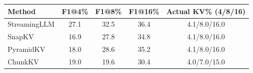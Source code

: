 \begin{tabular}{@{}lcccc@{}}
\toprule
Method & F1@4\% & F1@8\% & F1@16\% & Actual KV\% (4/8/16) \\
\midrule
StreamingLLM & 27.1 & 32.5 & 36.4 & 4.1/8.0/16.0 \\
SnapKV & 16.9 & 27.8 & 34.8 & 4.1/8.0/16.0 \\
PyramidKV & 18.0 & 28.6 & 35.2 & 4.1/8.0/16.0 \\
ChunkKV & 19.0 & 19.6 & 30.4 & 4.0/7.0/15.0 \\
\bottomrule
\end{tabular}

